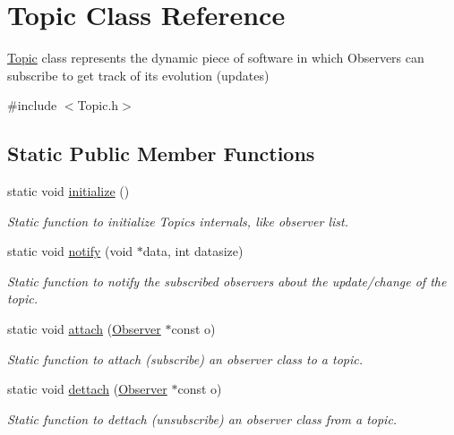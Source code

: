 \hypertarget{class_topic}{\section{Topic Class Reference}
\label{class_topic}
}


\hyperlink{class_topic}{Topic} class represents the dynamic piece of software in which Observers can subscribe to get track of its evolution (updates)  




{\ttfamily \#include $<$Topic.\-h$>$}

\subsection*{Static Public Member Functions}
\begin{DoxyCompactItemize}
\item 
\hypertarget{class_topic_a2a7135a4cd0cda246d23807968a47417}{static void \hyperlink{class_topic_a2a7135a4cd0cda246d23807968a47417}{initialize} ()}\label{class_topic_a2a7135a4cd0cda246d23807968a47417}

\begin{DoxyCompactList}\small\item\em Static function to initialize Topics internals, like observer list. \end{DoxyCompactList}\item 
static void \hyperlink{class_topic_aca1f8ce134afe3fcd73249926737aea9}{notify} (void $\ast$data, int datasize)
\begin{DoxyCompactList}\small\item\em Static function to notify the subscribed observers about the update/change of the topic. \end{DoxyCompactList}\item 
static void \hyperlink{class_topic_a0c0433f4a0a763d561591d86154306bb}{attach} (\hyperlink{class_observer}{Observer} $\ast$const o)
\begin{DoxyCompactList}\small\item\em Static function to attach (subscribe) an observer class to a topic. \end{DoxyCompactList}\item 
static void \hyperlink{class_topic_aad2e588c40b235ece6912d163d55e42a}{dettach} (\hyperlink{class_observer}{Observer} $\ast$const o)
\begin{DoxyCompactList}\small\item\em Static function to dettach (unsubscribe) an observer class from a topic. \end{DoxyCompactList}\end{DoxyCompactItemize}


